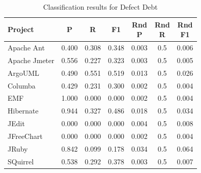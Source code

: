 \begin{table}[!hbt]
    \begin{center}
        \caption{Classification results for Defect Debt}
        \label{tbl:classifier_results_defect}
        \begin{tabular}{l| c c c c c c}
        \toprule
        \textbf{Project} & \textbf{P} & \textbf{R} & \textbf{F1} & \thead{Rnd\\P} & \thead{Rnd\\R} & \thead{Rnd\\F1} \\
        \midrule
         Apache Ant     &               0.400 &            0.308 &        0.348 &                     0.003 &                    0.5 &              0.006 \\
         Apache Jmeter  &               0.556 &            0.227 &        0.323 &                     0.003 &                    0.5 &              0.005 \\
         ArgoUML        &               0.490 &            0.551 &        0.519 &                     0.013 &                    0.5 &              0.026 \\
         Columba        &               0.429 &            0.231 &        0.300 &                     0.002 &                    0.5 &              0.004 \\
         EMF            &               1.000 &            0.000 &        0.000 &                     0.002 &                    0.5 &              0.004 \\
         Hibernate      &               0.944 &            0.327 &        0.486 &                     0.018 &                    0.5 &              0.034 \\
         JEdit          &               0.000 &            0.000 &        0.000 &                     0.004 &                    0.5 &              0.008 \\
         JFreeChart     &               0.000 &            0.000 &        0.000 &                     0.002 &                    0.5 &              0.004 \\
         JRuby          &               0.842 &            0.099 &        0.178 &                     0.034 &                    0.5 &              0.064 \\
         SQuirrel       &               0.538 &            0.292 &        0.378 &                     0.003 &                    0.5 &              0.007 \\
        \bottomrule
        \end{tabular}
    \end{center}    
\end{table}

